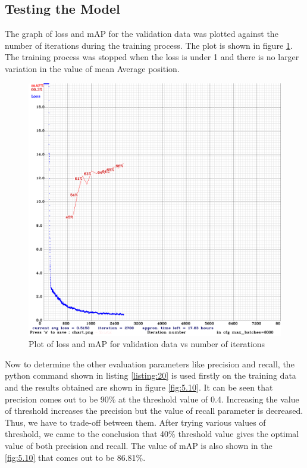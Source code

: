 \subsection{Testing the Model}
The graph of loss and mAP for the validation data was plotted against the number of iterations during the training process. The plot is shown in figure \ref{fig:5.9}. The training process was stopped when the loss is under 1 and there is no larger variation in the value of mean Average position.
\begin{figure}[H]
\centering
\captionsetup{justification = centering}
\includegraphics[scale= 0.25]{CHAPTERS/Chapter-5/images/5.9.PNG}
\caption{Plot of loss and mAP for validation data vs number of iterations}
\label{fig:5.9}
\end{figure}
\noindent
Now to determine the other evaluation parameters like precision and recall, the python command shown in listing \ref{listing:20} is used firstly on the training data and the results obtained are shown in figure \ref{fig:5.10}. It can be seen that precision comes out to be 90\% at the threshold value of 0.4. Increasing the value of threshold increases the precision but the value of recall parameter is decreased. Thus, we have to trade-off between them. After trying various values of threshold, we came to the conclusion that 40\% threshold value gives the optimal value of both precision and recall. The value of mAP is also shown in the \ref{fig:5.10} that comes out to be 86.81\%.
